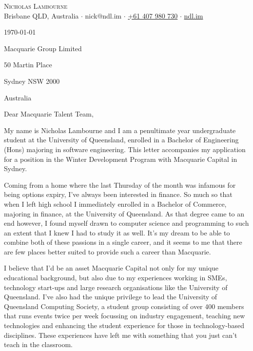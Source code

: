 \documentclass[a4paper]{article}
\begin{document}
\vspace*{-50pt}

\begin{center}
	{\Huge \scshape {Nicholas Lambourne}}\\
	\vspace{3pt}
	Brisbane QLD, Australia $\cdot$ nick@ndl.im $\cdot$ \href{tel:61407980730}{+61 407 980 730} $\cdot$ \href{https://ndl.im}{ndl.im}\\
	\hrulefill
\end{center}

\vspace{5pt}

\today{}

\vspace{30pt}

Macquarie Group Limited

50 Martin Place

Sydney NSW 2000

Australia

\vspace{30pt}

Dear Macquarie Talent Team,

\vspace{30pt}

My name is Nicholas Lambourne and I am a penultimate year undergraduate student at the University of Queensland, enrolled in a Bachelor of Engineering (Hons) majoring in software engineering. This letter accompanies my application for a position in the Winter Development Program with Macquarie Capital in Sydney.

\vspace{18pt}

Coming from a home where the last Thursday of the month was infamous for being options expiry, I've always been interested in finance. So much so that when I left high school I immediately enrolled in a Bachelor of Commerce, majoring in finance, at the University of Queensland. As that degree came to an end however, I found myself drawn to computer science and programming to such an extent that I knew I had to study it as well. It's my dream to be able to combine both of these passions in a single career, and it seems to me that there are few places better suited to provide such a career than Macquarie.

\vspace{18pt}

I believe that I'd be an asset Macquarie Capital not only for my unique educational background, but also due to my experiences working in SMEs, technology start-ups and large research organisations like the University of Queensland. I've also had the unique privilege to lead the University of Queensland Computing Society, a student group consisting of over 400 members that runs events twice per week focussing on industry engagement, teaching new technologies and enhancing the student experience for those in technology-based disciplines. These experiences have left me with something that you just can't teach in the classroom.
\end{document}
